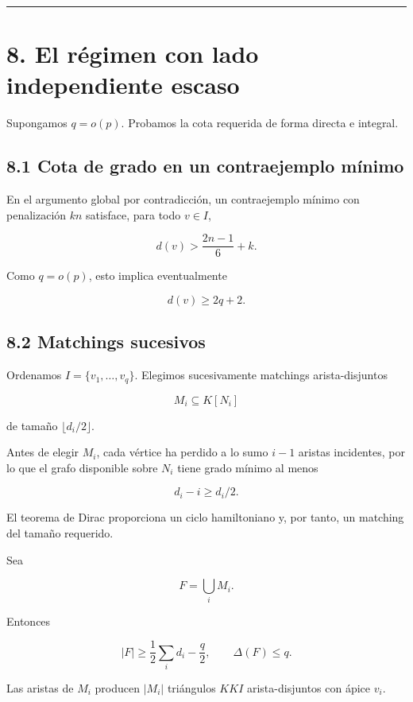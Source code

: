 \documentclass[
  11pt,
]{article}
\begin{document}
\begin{center}\rule{0.5\linewidth}{0.5pt}\end{center}

\section{8. El régimen con lado independiente escaso}\label{el-ruxe9gimen-con-lado-independiente-escaso}

Supongamos \(q=o(p)\). Probamos la cota requerida de forma directa e integral.

\subsection{8.1 Cota de grado en un contraejemplo mínimo}\label{cota-de-grado-en-un-contraejemplo-muxednimo}

En el argumento global por contradicción, un contraejemplo mínimo con penalización \(kn\) satisface, para todo \(v\in I\),

\[
d(v)>
\frac{2n-1}{6}+k.
\tag{8.1}
\]

Como \(q=o(p)\), esto implica eventualmente

\[
d(v)\ge2q+2.
\tag{8.2}
\]

\subsection{8.2 Matchings sucesivos}\label{matchings-sucesivos}

Ordenamos \(I=\{v_1,\ldots,v_q\}\). Elegimos sucesivamente matchings arista-disjuntos

\[
M_i\subseteq K[N_i]
\]

de tamaño \(\lfloor d_i/2\rfloor\).

Antes de elegir \(M_i\), cada vértice ha perdido a lo sumo \(i-1\) aristas incidentes, por lo que el grafo disponible sobre \(N_i\) tiene grado mínimo al menos

\[
d_i-i\ge d_i/2.
\]

El teorema de Dirac proporciona un ciclo hamiltoniano y, por tanto, un matching del tamaño requerido.

Sea

\[
F=\bigcup_iM_i.
\]

Entonces

\[
|F|
\ge
\frac12\sum_i d_i-\frac q2,
\qquad
\Delta(F)\le q.
\tag{8.3}
\]

Las aristas de \(M_i\) producen \(|M_i|\) triángulos \(KKI\) arista-disjuntos con ápice \(v_i\).
\end{document}
